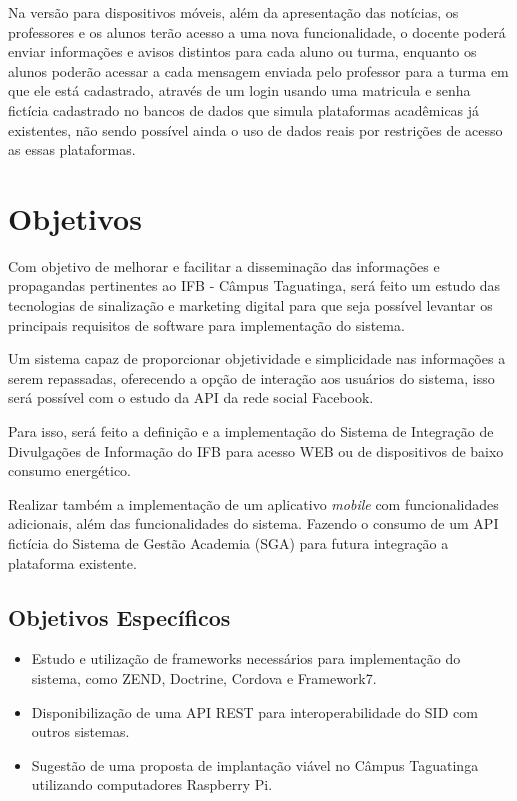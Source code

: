 Na versão para dispositivos móveis, além da apresentação das notícias, os professores e os alunos terão acesso a uma nova funcionalidade, o docente poderá enviar informações e avisos distintos para cada aluno ou turma, enquanto os alunos poderão acessar a cada mensagem enviada pelo professor para a turma em que ele está cadastrado, através de um login usando uma matricula e senha fictícia cadastrado no bancos de dados que simula plataformas acadêmicas já existentes, não sendo possível ainda o uso de dados reais por restrições de acesso as essas plataformas.

\section{Objetivos}
Com objetivo de melhorar e facilitar a disseminação das informações e propagandas pertinentes ao IFB - Câmpus Taguatinga, será feito um estudo das tecnologias de sinalização e marketing digital para que seja possível levantar  os principais requisitos de software para implementação do sistema.

Um sistema capaz de proporcionar objetividade e simplicidade nas informações a serem repassadas, oferecendo a opção de interação aos usuários do sistema, isso será possível com o estudo da API da rede social Facebook.

Para isso, será feito a definição e a implementação do Sistema de Integração de Divulgações de Informação do IFB para acesso WEB ou de dispositivos de baixo consumo energético.

Realizar também a implementação de um aplicativo \textit{mobile} com funcionalidades adicionais, além das funcionalidades do sistema. Fazendo o consumo de um API fictícia do Sistema de Gestão Academia (SGA) para futura integração a plataforma existente.

\subsection{Objetivos Específicos}
	 \begin{itemize}
	\item Estudo e utilização de frameworks necessários para implementação do sistema, como ZEND, Doctrine, Cordova e Framework7.
	 	
	\item Disponibilização de uma API REST para interoperabilidade do SID com outros sistemas.
	
	\item Sugestão de uma proposta de implantação viável no Câmpus Taguatinga utilizando computadores Raspberry Pi.
	\end{itemize}
	
